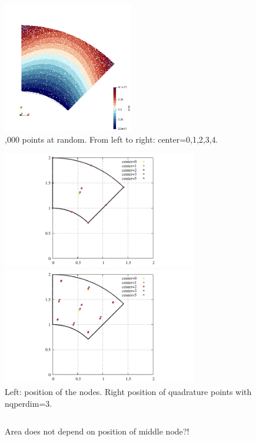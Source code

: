 \begin{center}
\includegraphics[width=5.7cm]{images/mappings/biquadratic3/elt4/jcob_4}\\
{,000 points at random. From left to right: center=0,1,2,3,4.} 
\end{center}




\begin{center}
\includegraphics[width=8.5cm]{images/mappings/biquadratic3/elt4/nodes}
\includegraphics[width=8.5cm]{images/mappings/biquadratic3/elt4/quads}\\
{\captionfont Left: position of the nodes. Right position of quadrature points with 
nqperdim=3.}
\end{center}

\begin{verbatim}

\end{verbatim}

Area does not depend on position of middle node?!


